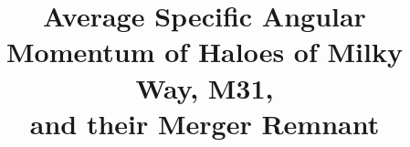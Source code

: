 \documentclass[twocolumn]{aastex631}
\begin{document}

\title{Average Specific Angular Momentum of Haloes of Milky Way, M31,\\ and their Merger Remnant}


\end{document}
